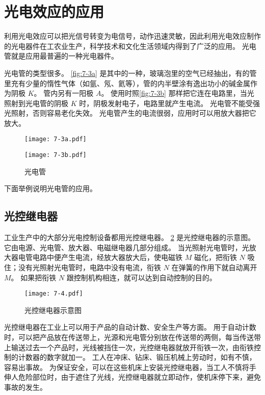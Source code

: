 \section{光电效应的应用}

利用光电效应可以把光信号转变为电信号，动作迅速灵敏，因此利用光电效应制作的光电器件在工农业生产，科学技术和文化生活领域内得到了广泛的应用。
光电管就是应用最普遍的一种光电器件。

光电管的类型很多。
\cref{fig:7-3a} 是其中的一种，玻璃泡里的空气已经抽出，有的管里充有少量的惰性气体（如氩、氖、氦等），管的内半壁涂有逸出功小的碱金属作为阴极 $K$。
管内另有一阳极 $A$。
使用时照\cref{fig:7-3b} 那样把它连在电路里，当光照射到光电管的阴极 $K$ 时，阴极发射电子，电路里就产生电流。
光电管不能受强光照射，否则容易老化失效。
光电管产生的电流很弱，应用时可以用放大器把它放大。
\begin{figure}
  \begin{minipage}[b]{0.45\linewidth}\centering
    \texttt{[image: 7-3a.pdf]}
    \subcaption{}\label{fig:7-3a}
  \end{minipage}
  \begin{minipage}[b]{0.45\linewidth}\centering
    \texttt{[image: 7-3b.pdf]}
    \subcaption{}\label{fig:7-3b}
  \end{minipage}
  \caption{光电管}\label{fig:7-3}
\end{figure}

下面举例说明光电管的应用。

\subsection{光控继电器}
工业生产中的大部分光电控制设备都用光控继电器。
\cref{fig:7-4} 是光控继电器的示意图。
它由电源、光电管、放大器、电磁继电器几部分组成。
当光照射光电管时，光放大器电管电路中便产生电流，经放大器放大后，使电磁铁 $M$ 磁化，把衔铁 $N$ 吸住；没有光照射光电管时，电路中没有电流，衔铁 $N$ 在弹簧的作用下就自动离开 $M$。
如果把衔铁 $N$ 跟控制机构相连，就可以达到自动控制的目的。
\begin{figure}
  \texttt{[image: 7-4.pdf]}
  \caption{光控继电器示意图}\label{fig:7-4}
\end{figure}

光控继电器在工业上可以用于产品的自动计数、安全生产等方面。
用于自动计数时，可以把产品放在传送带上，光源和光电管分别放在传送带的两侧，每当传送带上输送过去一个产品时，光线被挡住一次，光控继电器就放开衔铁一次，由衔铁控制的计数器的数字就加一。
工人在冲床、钻床、锻压机械上劳动时，如有不慎，容易出事故。
为保证安全，可以在这些机床上安装光控继电器，当工人不慎将手伸人危险部位时，由于遮住了光线，光控继电器就立即动作，使机床停下来，避免事故的发生。

